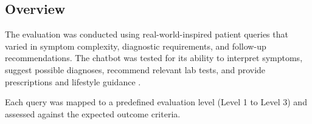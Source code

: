 \documentclass[12pt,a4paper]{report}
\begin{document}
%
%
%
%
%    
%    
%    
%    
%


\subsection{Overview}
\label{Overview}

The evaluation was conducted using real-world-inspired patient queries that varied in symptom complexity, diagnostic requirements, and follow-up recommendations. The chatbot was tested for its ability to interpret symptoms, suggest possible diagnoses, recommend relevant lab tests, and provide prescriptions and lifestyle guidance \cite{digital_health_platforms}.

Each query was mapped to a predefined evaluation level (Level 1 to Level 3) and assessed against the expected outcome criteria.
\end{document}
